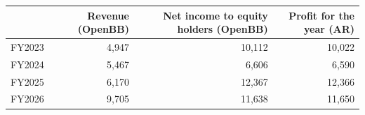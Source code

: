 \begin{tabular}{lrrr}
\toprule
 & Revenue (OpenBB) & Net income to equity holders (OpenBB) & Profit for the year (AR) \\
\midrule
FY2023 & 4,947 & 10,112 & 10,022 \\
FY2024 & 5,467 & 6,606 & 6,590 \\
FY2025 & 6,170 & 12,367 & 12,366 \\
FY2026 & 9,705 & 11,638 & 11,650 \\
\bottomrule
\end{tabular}
